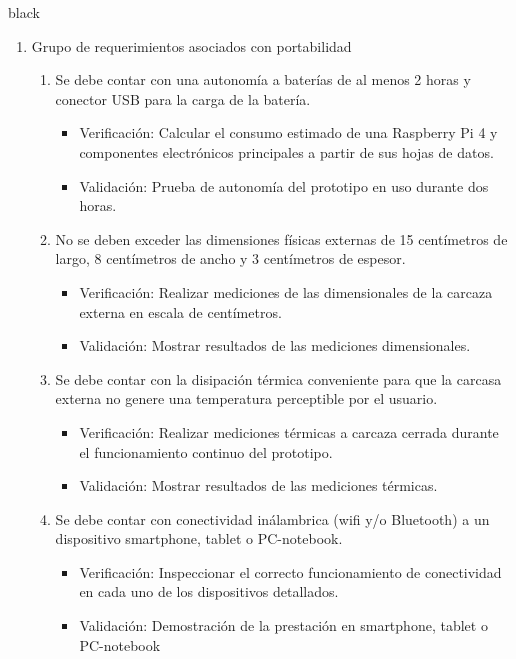 \documentclass[11pt]{charter}
\begin{document}
\begin{consigna}{black}
\begin{enumerate}
\item Grupo de requerimientos asociados con portabilidad
	\begin{enumerate}
	\item Se debe contar con una autonomía a baterías de al menos 2 horas y conector USB para la carga de la batería.
	\begin{itemize}
		\item Verificación: Calcular el consumo estimado de una Raspberry Pi 4 y componentes electrónicos principales a partir de sus hojas de datos.
		\item Validación: Prueba de autonomía del prototipo en uso durante dos horas.\\
	\end{itemize}
	\item No se deben exceder las dimensiones físicas externas de 15 centímetros de largo, 8 centímetros de ancho y 3 centímetros de espesor.
	\begin{itemize}
		\item Verificación: Realizar mediciones de las dimensionales de la carcaza externa en escala de centímetros.
		\item Validación: Mostrar resultados de las mediciones dimensionales.\\
	\end{itemize}
	\item Se debe contar con la disipación térmica conveniente para que la carcasa externa no genere una temperatura perceptible por el usuario.
	\begin{itemize}
		\item Verificación: Realizar mediciones térmicas a carcaza cerrada durante el funcionamiento continuo del prototipo.
		\item Validación: Mostrar resultados de las mediciones térmicas.\\
	\end{itemize}
	\item Se debe contar con conectividad inálambrica (wifi y/o Bluetooth) a un dispositivo smartphone, tablet o PC-notebook.
	\begin{itemize}
		\item Verificación: Inspeccionar el correcto funcionamiento de conectividad en cada uno de los dispositivos detallados.
		\item Validación: Demostración de la prestación en smartphone, tablet o PC-notebook\\
	\end{itemize}
	\end{enumerate}
	
\end{enumerate}

\end{consigna}
\pagebreak
\end{document}
